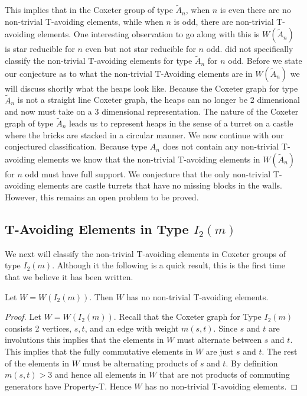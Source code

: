 This implies that in the Coxeter group of type $\widetilde{A}_n$, when $n$ is even there are no non-trivial T-avoiding elements, while when $n$ is odd, there are non-trivial T-avoiding elements. One interesting observation to go along with this is $W(\widetilde{A}_n)$ is star reducible for $n$ even but not star reducible for $n$ odd. \cite{Fan1999} did not specifically classify the non-trivial T-avoiding elements for type $\widetilde{A}_n$ for $n$ odd. Before we state our conjecture as to what the non-trivial T-Avoiding elements are in $W(\widetilde{A}_n)$ we will discuss shortly what the heaps look like. Because the Coxeter graph for type $\widetilde{A}_n$ is not a straight line Coxeter graph, the heaps can no longer be 2 dimensional and now must take on a 3 dimensional representation. The nature of the Coxeter graph of type $\widetilde{A}_n$ leads us to represent heaps in the sense of a turret on a castle where the bricks are stacked in a circular manner. We now continue with our conjectured classification. Because type $A_n$ does not contain any non-trivial T-avoiding elements we know that the non-trivial T-avoiding elements in $W(\widetilde{A}_n)$ for $n$ odd must have full support. We conjecture that the only non-trivial T-avoiding elements are castle turrets that have no missing blocks in the walls. However, this remains an open problem to be proved.


\subsection{T-Avoiding Elements in Type $I_2(m)$}

We next will classify the non-trivial T-avoiding elements in Coxeter groups of type $I_2(m)$. Although it the following is a quick result, this is the first time that we believe it has been written.
\begin{theorem}
Let $W=W(I_2(m))$. Then $W$ has no non-trivial T-avoiding elements.
\begin{proof}
	Let $W=W(I_2(m))$. Recall that the Coxeter graph for Type $I_2(m)$ consists 2 vertices, $s,t$, and an edge with weight $m(s,t)$. Since $s$ and $t$ are involutions this implies that the elements in $W$ must alternate between $s$ and $t$. This implies that the fully commutative elements in $W$ are just $s$ and $t$. The rest of the elements in $W$ must be alternating products of $s$ and $t$. By definition $m(s,t)>3$ and hence all elements in $W$ that are not products of commuting generators have Property-T. Hence $W$ has no non-trivial T-avoiding elements. 
\end{proof}	
\end{theorem}
 
